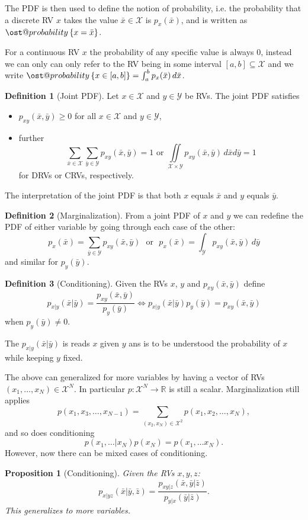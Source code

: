 \documentclass[]{hsrzf}
\makeatletter
\renewcommand*{\Pr}[2][]{\ost@probability_{#1}\left\{#2\right\}}
\theoremstyle{plain}
\newtheorem{prop}{Proposition}[section]
\theoremstyle{definition}
\newtheorem{defn}{Definition}[section]
\theoremstyle{remark}
\makeatother
\begin{document}
The PDF is then used to define the notion of probability, i.e. the probability
that a discrete RV $x$ takes the value $\bar{x} \in \mathcal{X}$ is
$p_x(\bar{x})$, and is written as $\Pr{x = \bar{x}}$.

For a continuous RV $x$ the probability of any specific value is always 0,
instead we can only can only refer to the RV being in some interval $[a,b]
\subseteq \mathcal{X}$ and we write $\Pr{x \in [a,b]} = \int_a^b p_x(\bar{x})
\,d\bar{x}$.

\begin{defn}[Joint PDF]
  Let $x \in \mathcal{X}$ and $y \in \mathcal{Y}$ be RVs. The joint PDF
  satisfies
  \begin{itemize}
    \item $p_{xy}(\bar{x}, \bar{y}) \geq 0$ for all $x \in\mathcal{X}$ and $y
      \in \mathcal{Y}$,
    \item further
      \[
        \sum_{\bar{x}\in\mathcal{X}}\sum_{\bar{y}\in\mathcal{Y}}
        p_{xy}(\bar{x}, \bar{y}) = 1
        \text{ or }
        \iint\limits_{\mathcal{X}\times\mathcal{Y}} p_{xy}(\bar{x}, \bar{y})
        \,d\bar{x}d\bar{y} = 1
      \]
      for DRVs or CRVs, respectively.
  \end{itemize}
\end{defn}

The interpretation of the joint PDF is that both $x$ equals $\bar{x}$ and $y$
equals $\bar{y}$.

\begin{defn}[Marginalization]
  From a joint PDF of $x$ and $y$ we can redefine the PDF of either variable
  by going through each case of the other:
  \[
    p_x(\bar{x}) = \sum_{\bar{y} \in \mathcal{Y}} p_{xy} (\bar{x}, \bar{y})
    \text{~~or~~}
    p_x(\bar{x}) = \int_\mathcal{Y} p_{xy} (\bar{x}, \bar{y}) \,
    d\bar{y}
  \]
  and similar for $p_y(\bar{y})$.
\end{defn}

\begin{defn}[Conditioning]
  Given the RVs $x$, $y$ and $p_{xy}(\bar{x}, \bar{y})$ define
  \[
    p_{x|y}(\bar{x} | \bar{y}) = \frac{p_{xy}(\bar{x}, \bar{y})}{p_y(\bar{y})}
    \iff
    p_{x|y}(\bar{x} | \bar{y}) p_y(\bar{y}) = p_{xy}(\bar{x}, \bar{y})
  \]
  when $p_y(\bar{y}) \neq 0$.
\end{defn}

The $p_{x|y}(\bar{x} | \bar{y})$ is reads $x$ given $y$ ans is to be
understood the probability of $x$ while keeping $y$ fixed.

The above can generalized for more variables by having a vector of RVs
$(x_1,\ldots, x_N) \in \mathcal{X}^N$. In particular $p : \mathcal{X}^N \to
\mathbb{R}$ is still a scalar. Marginalization still applies
\[
  p(x_1, x_3, \ldots, x_{N-1}) = \sum_{(x_{2}, x_{N}) \in \mathcal{X}^2}
  p(x_1, x_2, \ldots, x_N),
\]
and so does conditioning
\[
  p(x_1, \ldots | x_N) p(x_N) = p(x_1, \ldots x_N).
\]
However, now there can be mixed cases of conditioning.
\begin{prop}[Conditioning]
  Given the RVs $x, y, z$:
  \[
    p_{x|yz}(\bar{x} | \bar{y}, \bar{z}) = 
      \frac{p_{xy|z}(\bar{x},\bar{y} | \bar{z})}{p_{y|x}(\bar{y} | \bar{z})}.
  \]
  This generalizes to more variables.
\end{prop}
\end{document}
